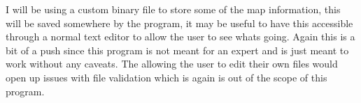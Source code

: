 \begin{FlushLeft}
            I will be using a custom binary file to store some of the map information, this will be saved somewhere by the program, it may be useful to have this accessible through a normal text editor to allow the user to see whats going. Again this is a bit of a push since this program is not meant for an expert and is just meant to work without any caveats. The allowing the user to edit their own files would open up issues with file validation which is again is out of the scope of this program.
            \BK
        \bk

\end{FlushLeft}
